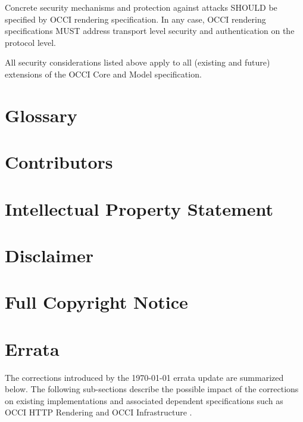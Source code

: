 \documentclass[10pt,a4paper]{article}
\begin{document}
Concrete security mechanisms and protection against attacks SHOULD be specified
by OCCI rendering specification. In any case, OCCI rendering specifications MUST
address transport level security and authentication on the protocol level.

All security considerations listed above apply to all (existing and future)
extensions of the OCCI Core and Model specification.

\section{Glossary}
\label{sec:glossary}


\section{Contributors}


\section{Intellectual Property Statement}


\section{Disclaimer}


\section{Full Copyright Notice}





\appendix

\newpage
\section{Errata}
\label{sec:errata}

The corrections introduced by the {\today} errata update are summarized below.
The following sub-sections describe the possible impact of the corrections
on existing implementations and associated dependent specifications such
as OCCI HTTP Rendering \cite{occi:http_rendering} and  OCCI Infrastructure
\cite{occi:infrastructure}.
\end{document}
